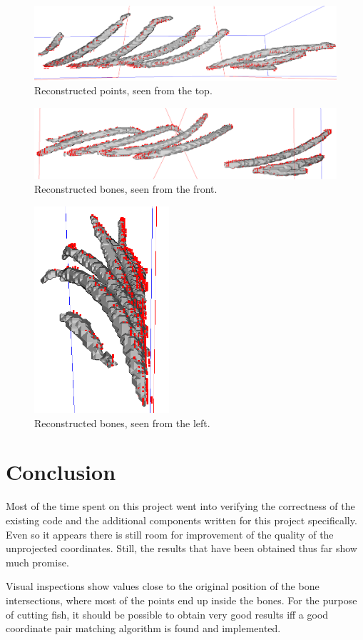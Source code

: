 \begin{figure}
	\centering
	\includegraphics[width=160mm]{images/fish/bones1.png}
	\caption{Reconstructed points, seen from the top.}
	\label{fig:bones_top}
\end{figure}

\begin{figure}
	\centering
	\includegraphics[width=160mm]{images/fish/bones2.png}
	\caption{Reconstructed bones, seen from the front.}
	\label{fig:bones_front}
\end{figure}

\begin{figure}
	\centering
	\includegraphics[width=50mm]{images/fish/bones3.png}
	\caption{Reconstructed bones, seen from the left.}
	\label{fig:bones_left}
\end{figure}

\section{Conclusion}
Most of the time spent on this project went into verifying the correctness of the existing code and the additional components written for this project specifically. Even so it appears there is still room for improvement of the quality of the unprojected coordinates. Still, the results that have been obtained thus far show much promise. 

Visual inspections show values close to the original position of the bone intersections, where most of the points end up inside the bones. For the purpose of cutting fish, it should be possible to obtain very good results iff a good coordinate pair matching algorithm is found and implemented.